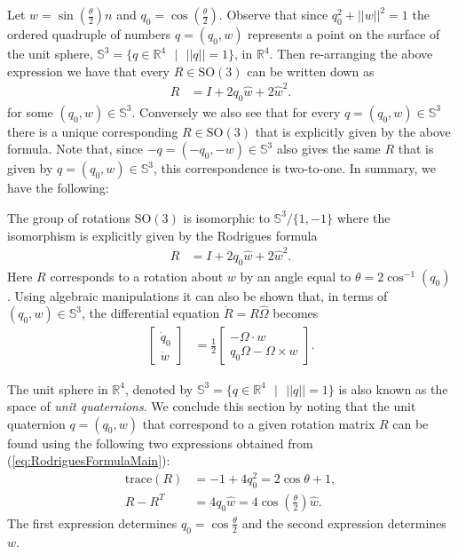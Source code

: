 \documentclass[graybox,envcountchap,sectrefs]{svmonoMuga}
\begin{document}
Let $w=\sin{\left(\frac{\theta}{2}\right)}n$ and 
$q_0=\cos{\left(\frac{\theta}{2}\right)}$.  Observe that since $q_0^2+||w||^2=1$ the ordered quadruple of numbers $q=(q_0,w)$ represents a point on the surface of the unit sphere, $\mathbb{S}^3=\{q\in \mathbb{R}^4\:\:\: |\:\:\: ||q||=1\}$, in $\mathbb{R}^4$.  Then re-arranging the above expression we have that every $R\in \mathrm{SO}(3)$ can be written down as
\begin{align*}
R&=I+2q_0\widehat{w}+2\widehat{w}^2.
\end{align*}
for some $(q_0,w)\in\mathbb{S}^3$. 
Conversely we also see that for every $q=(q_0,w)\in \mathbb{S}^3$ there is a unique corresponding $R\in \mathrm{SO}(3)$  that is explicitly given by the above formula. Note that, since $-q=(-q_0,-w)\in \mathbb{S}^3$ also gives the same $R$ that is given by $q=(q_0,w)\in \mathbb{S}^3$, this correspondence is two-to-one. In summary, we have the following:
\begin{svgraybox}
The group of rotations $\mathrm{SO}(3)$ is isomorphic to $\mathbb{S}^3/\{1,-1\}$ where the isomorphism is explicitly given by the Rodrigues formula 
\begin{align}
R&=I+2q_0\widehat{w}+2\widehat{w}^2.\label{eq:RodriguesFormulaMain}
\end{align}
Here $R$ corresponds to a rotation about $w$ by an angle equal to $\theta =2\cos^{-1}({q_0})$.
Using algebraic manipulations it can also be shown that, in terms of $(q_0,w)\in \mathbb{S}^3$, the differential equation $\dot{R}=R\widehat{\Omega}$ becomes
\begin{align}
\left[\begin{array}{c}\dot{q}_0 \\ \dot{w}
\end{array}\right] &=
\frac{1}{2}\left[\begin{array}{c}-\Omega \cdot w \\ q_0\Omega-\Omega\times {w}
\end{array}\right].\label{eq:QuaternionEquations}
\end{align}
\end{svgraybox}

The unit sphere in $\mathbb{R}^4$, denoted by $\mathbb{S}^3=\{q\in \mathbb{R}^4 \:\:\:|
\:\:\: ||q||=1\}$ is also known as the space of \textit{unit quaternions}. We conclude this section by noting that the unit quaternion $q=(q_0,w)$ that correspond to a given rotation matrix $R$ can be found using the following two expressions obtained from (\ref{eq:RodriguesFormulaMain}):
\begin{align}
\mathrm{trace}(R)&=-1+4q_0^2=2\cos \theta +1,\\
R-R^T&=4q_0 \widehat{w}=4\cos{\left(\frac{\theta}{2}\right)} \widehat{w}.
\end{align}
The first expression determines $q_0=\cos{\frac{\theta}{2}}$ and the second expression determines $w$.
\end{document}
